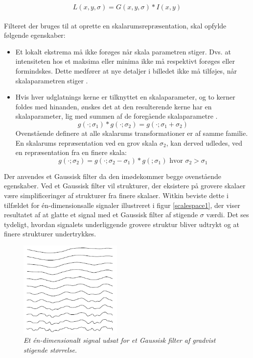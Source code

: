 \begin{equation}
L(x,y,\sigma) = G(x,y,\sigma)\ast I(x,y)
\label{scalespace1}
\end{equation}
\\
Filteret der bruges til at oprette en skalarumsrepræsentation, skal opfylde følgende egenskaber:
\begin{itemize}
\item{Et lokalt ekstrema må ikke forøges når skala parametren stiger. Dvs. at intensiteten hos et maksima eller minima ikke må respektivt forøges eller formindskes. Dette medfører at nye detaljer i billedet ikke må tilføjes, når skalaparametren stiger \cite{lindkth}.}
\item{Hvis hver udglatnings kerne er tilknyttet en skalaparameter, og to kerner foldes med hinanden, ønskes det at den resulterende kerne har en skalaparameter, lig med summen af de foregående skalaparametre \cite{springer}.
\begin{equation}
g(\cdot;\sigma_1) \ast g(\cdot;\sigma_2)=g(\cdot;\sigma_1+\sigma_2)
\label{semi}
\end{equation}
Ovenstående definere at alle skalarums transformationer er af samme familie. En skalarums repræsentation ved en grov skala $\sigma_2$, kan derved udledes, ved en repræsentation fra en finere skala:
\begin{equation}
g(\cdot;\sigma_2) = g(\cdot;\sigma_2-\sigma_1)\ast g(;\sigma_1)\text{     hvor     }\sigma_2>\sigma_1
\end{equation}}
\end{itemize}
Der anvendes et Gaussisk filter da den imødekommer begge ovenstående egenskaber. Ved et Gaussisk filter vil strukturer, der eksistere på grovere skalaer være simplificeringer af strukturer fra finere skalaer. Witkin \cite{witkins} beviste dette i tilfældet for én-dimensionsalle signaler illustreret i figur \ref{scalespace1}, der viser resultatet af at glatte et signal med et Gaussisk filter af stigende $\sigma$ værdi. Det ses tydeligt, hvordan signalets underliggende grovere struktur bliver udtrykt og at finere strukturer undertrykkes.
\begin{figure}[H]
    \centering
    \includegraphics[width=0.45\textwidth]{fig/33.png}
     \vspace{-1em}
    \begin{center}    
       \caption{{\footnotesize \textit{Et én-dimensionalt signal udsat for et Gaussisk filter af gradvist stigende størrelse.}}}
    \label{fig:scalereps}
     \end{center}
     \vspace{-2.5em}
  \end{figure} \noindent
